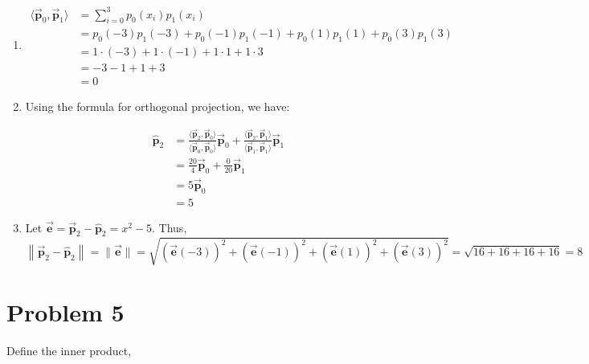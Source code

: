 \documentclass[letter,11pt]{article}
\theoremstyle{definition}
\begin{document}
\begin{tcolorbox}[boxrule=1mm,enhanced jigsaw, breakable,before=\hfill,after=\hfill,adjusted title={Problem 4 solutions}]
    \begin{enumerate}[label = \roman*.]
        \item 
           \begin{align*}
                \langle \vec{\boldsymbol{p}}_{0}, \vec{\boldsymbol{p}}_{1} \rangle &= \sum_{i=0}^{3} p_{0}(x_i)p_{1}(x_i) \\
                &= p_{0}(-3)p_{1}(-3) + p_{0}(-1)p_{1}(-1) + p_{0}(1)p_{1}(1) + p_{0}(3)p_{1}(3) \\
                &= 1 \cdot (-3) + 1 \cdot (-1) + 1 \cdot 1 + 1 \cdot 3 \\
                &= -3 - 1 + 1 + 3 \\
                &= 0
            \end{align*}

        \item Using the formula for orthogonal projection, we have:
        
        \begin{align*}
            \hat{\boldsymbol{p}}_{2} &= \frac{\langle \vec{\boldsymbol{p}}_{2}, \vec{\boldsymbol{p}}_{0} \rangle}{\langle \vec{\boldsymbol{p}}_{0}, \vec{\boldsymbol{p}}_{0} \rangle} \vec{\boldsymbol{p}}_{0} + \frac{\langle \vec{\boldsymbol{p}}_{2}, \vec{\boldsymbol{p}}_{1} \rangle}{\langle \vec{\boldsymbol{p}}_{1}, \vec{\boldsymbol{p}}_{1} \rangle} \vec{\boldsymbol{p}}_{1}\\
            &= \frac{20}{4} \vec{\boldsymbol{p}}_{0} + \frac{0}{20} \vec{\boldsymbol{p}}_{1}\\
            &= 5 \vec{\boldsymbol{p}}_{0}\\
            &= 5
        \end{align*}

        \item Let $\vec{\boldsymbol{e}}=\vec{\boldsymbol{p}}_2-\hat{\boldsymbol{p}}_2=x^2-5$. Thus,
$$
\left\|\vec{\boldsymbol{p}}_2-\hat{\boldsymbol{p}}_2\right\|=\|\vec{\boldsymbol{e}}\|=\sqrt{(\vec{\boldsymbol{e}}(-3))^2+(\vec{\boldsymbol{e}}(-1))^2+(\vec{\boldsymbol{e}}(1))^2+(\vec{\boldsymbol{e}}(3))^2}=\sqrt{16+16+16+16}=8
$$

    \end{enumerate}
\end{tcolorbox}

\section{Problem 5}
Define the inner product,
\end{document}
